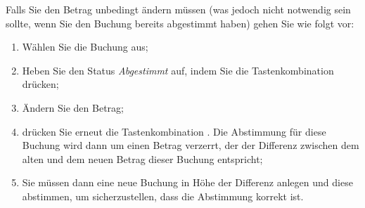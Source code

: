 Falls Sie den Betrag unbedingt ändern müssen (was jedoch nicht notwendig sein sollte, wenn Sie den Buchung bereits abgestimmt haben) gehen Sie wie folgt vor:
\begin{enumerate}
	\item Wählen Sie die Buchung aus;
	\item Heben Sie den Status \emph{Abgestimmt} auf, indem Sie die Tastenkombination  drücken;
	\item Ändern Sie den Betrag;
	\item drücken Sie erneut die Tastenkombination . Die Abstimmung für diese Buchung wird dann um einen Betrag verzerrt, der der Differenz zwischen dem alten und dem neuen Betrag dieser Buchung entspricht;
	\item Sie müssen dann eine neue Buchung in Höhe der Differenz anlegen und diese abstimmen, um sicherzustellen, dass die Abstimmung korrekt ist.
\end{enumerate}

